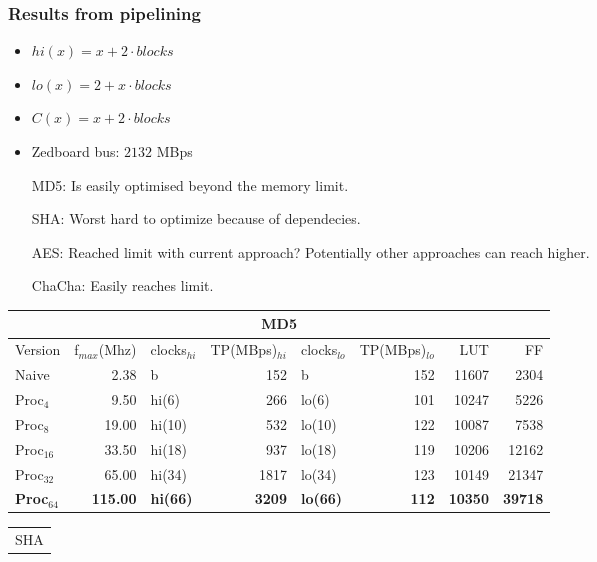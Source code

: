 \begin{frame}
  \frametitle{Results from pipelining}
  \fontsize{4pt}{6}\selectfont
\begin{minipage}[b]{0.3\textwidth}
  \begin{tiny}
  \begin{itemize}
  \item $hi(x) = x+2 \cdot blocks$
  \item $lo(x) = 2 + x \cdot blocks$
  \item $C(x) = x + 2 \cdot blocks$
  \item Zedboard bus: $2132$ MBps
  \end{itemize}
  \begin{itemize}
    \item[MD5:] Is easily optimised beyond the memory limit.
    \item[SHA:] Worst hard to optimize because of dependecies.
    \item[AES:] Reached limit with current approach? Potentially other approaches can reach higher.
    \item[ChaCha:] Easily reaches limit.
  \end{itemize}
  \end{tiny}
\end{minipage}
\qquad
\begin{minipage}[b]{0.65\textwidth}
\begin{tabular}{l r l r l r r r}
\multicolumn{8}{c}{MD5}\\
\hline
Version & f$_{max}$(Mhz) & clocks$_{hi}$ & TP(MBps)$_{hi}$ &clocks$_{lo}$ & TP(MBps)$_{lo}$ & LUT & FF\\
\hline
Naive     & 2.38   & b      &   152& b     &  152 & 11607 & 2304\\
Proc$_{4}$ & 9.50   & hi(6)  &  266& lo(6) & 101 & 10247 & 5226\\
Proc$_{8}$ & 19.00  & hi(10) &  532& lo(10)& 122 & 10087 & 7538\\
Proc$_{16}$ & 33.50  & hi(18) & 937& lo(18)&119 & 10206 & 12162\\
Proc$_{32}$ & 65.00  & hi(34) & 1817& lo(34)&123 & 10149 & 21347\\
\textbf{Proc}$_{64}$ & \textbf{115.00} & \textbf{hi(66)} & \textbf{3209}& \textbf{lo(66)} &\textbf{112} & \textbf{10350} & \textbf{39718}\\
\end{tabular}
\begin{tabular}{l r l r l r r r}
\multicolumn{8}{c}{SHA}\\

\end{tabular}
\end{minipage}
\end{frame}
